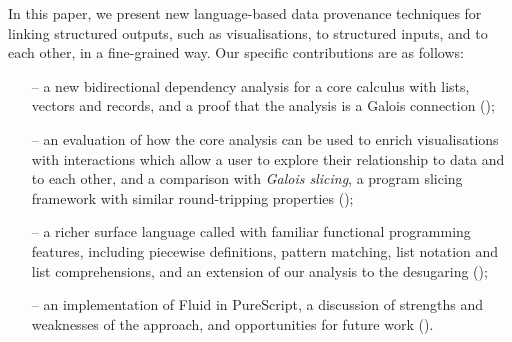 In this paper, we present new language-based data provenance techniques for linking structured outputs, such as visualisations, to structured inputs, and to each other, in a fine-grained way. Our specific contributions are as follows:

\begin{itemize}[leftmargin=*]
   \item[--] a new bidirectional dependency analysis for a core calculus with lists, vectors and records, and a proof that the analysis is a Galois connection ();
   \item[--] an evaluation of how the core analysis can be used to enrich visualisations with interactions which allow a user to explore their relationship to data and to each other, and a comparison with \emph{Galois slicing}, a program slicing framework with similar round-tripping properties ();
   \item[--] a richer surface language called \OurLanguage with familiar functional programming features, including piecewise definitions, pattern matching, list notation and list comprehensions, and an extension of our analysis to the desugaring ();
   \item[--] an implementation of Fluid in PureScript, a discussion of strengths and weaknesses of the approach, and opportunities for future work ().
\end{itemize}
